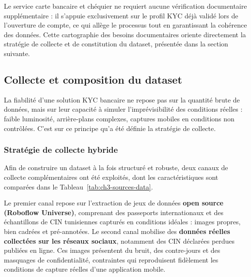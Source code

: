 Le service carte bancaire et chéquier ne requiert aucune vérification documentaire supplémentaire : il s'appuie exclusivement sur le profil KYC déjà validé lors de l'ouverture de compte, ce qui allège le processus tout en garantissant la cohérence des données. Cette cartographie des besoins documentaires oriente directement la stratégie de collecte et de constitution du dataset, présentée dans la section suivante.

\subsection{Collecte et composition du dataset}
\label{subsec:collecte-dataset}

La fiabilité d'une solution KYC bancaire ne repose pas sur la quantité brute de données, mais sur leur capacité à simuler l'imprévisibilité des conditions réelles : faible luminosité, arrière-plans complexes, captures mobiles en conditions non contrôlées. C'est sur ce principe qu'a été définie la stratégie de collecte.

\subsubsection{Stratégie de collecte hybride}

Afin de construire un dataset à la fois structuré et robuste, deux canaux de collecte complémentaires ont été exploités, dont les caractéristiques sont comparées dans le Tableau~\ref{tab:ch3-sources-data}.

Le premier canal repose sur l'extraction de jeux de données \textbf{open source (Roboflow Universe)}, comprenant des passeports internationaux et des échantillons de CIN tunisiennes capturés en conditions idéales : images propres, bien cadrées et pré-annotées. Le second canal mobilise des \textbf{données réelles collectées sur les réseaux sociaux}, notamment des CIN déclarées perdues publiées en ligne. Ces images présentent du bruit, des contre-jours et des masquages de confidentialité, contraintes qui reproduisent fidèlement les conditions de capture réelles d'une application mobile.

